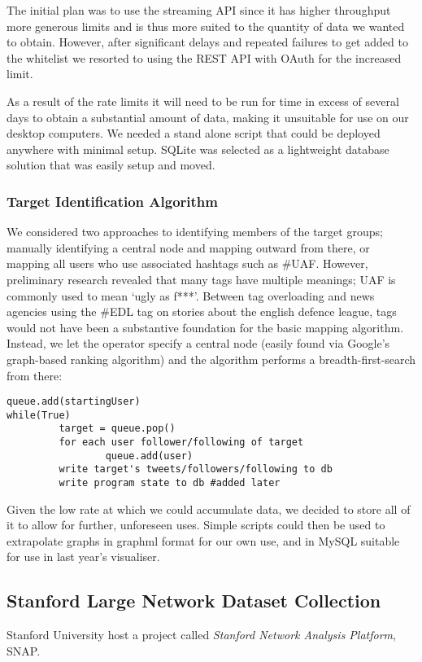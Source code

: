 The initial plan was to use the streaming API since it has higher throughput more generous limits and is thus more suited to the quantity of data we wanted to obtain. However, after significant delays and repeated failures to get added to the whitelist we resorted to using the REST API with OAuth for the increased limit.

As a result of the rate limits it will need to be run for time in excess of several days to obtain a substantial amount of data, making it unsuitable for use on our desktop computers. We needed a stand alone script that could be deployed anywhere with minimal setup. SQLite was selected as a lightweight database solution that was easily setup and moved.

\subsubsection{Target Identification Algorithm}
We considered two approaches to identifying members of the target groups; manually identifying a central node and mapping outward from there, or mapping all users who use associated hashtags such as \#UAF. However, preliminary research revealed that many tags have multiple meanings; UAF is commonly used to mean `ugly as f***'. Between tag overloading and news agencies using the \#EDL tag on stories about the english defence league, tags would not have been a substantive foundation for the basic mapping algorithm. Instead, we let the operator specify a central node (easily found via Google's graph-based ranking algorithm) and the algorithm performs a breadth-first-search from there:

\begin{verbatim}
queue.add(startingUser)
while(True)
         target = queue.pop()
         for each user follower/following of target
                 queue.add(user)
         write target's tweets/followers/following to db
         write program state to db #added later
\end{verbatim}

Given the low rate at which we could accumulate data, we decided to store all of it to allow for further, unforeseen uses. Simple scripts could then be used to extrapolate graphs in graphml format for our own use, and in MySQL suitable for use in last year's visualiser.

\subsection{Stanford Large Network Dataset Collection}
\label{sec:des_snap}
Stanford University host a project called \emph{Stanford Network Analysis Platform}, SNAP.

